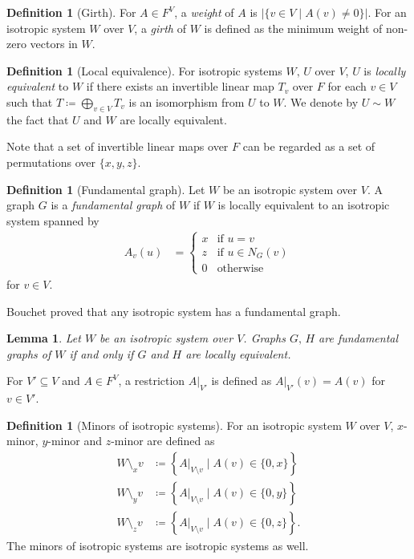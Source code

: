 \documentclass[twoside,10pt]{article}
\newtheorem{lemma}[theorem]{Lemma}
\theoremstyle{definition}
\newtheorem{definition}[theorem]{Definition}
\theoremstyle{remark}
\begin{document}
\begin{definition}[Girth]
For $A\in F^V$, a \textit{weight} of $A$ is $|\{v\in V\mid A(v)\ne 0\}|$.
For an isotropic system $W$ over $V$, a \textit{girth} of $W$ is defined as the minimum weight of non-zero vectors in $W$.
\end{definition}

\begin{definition}[Local equivalence]
For isotropic systems $W,\,U$ over $V$, $U$ is \textit{locally equivalent} to $W$ if there exists an invertible linear map $T_v$ over $F$ for each $v\in V$ such that $T\coloneqq \bigoplus_{v\in V}T_v$ is an isomorphism from $U$ to $W$.
We denote by $U\sim W$ the fact that $U$ and $W$ are locally equivalent.
\end{definition}
Note that a set of invertible linear maps over $F$ can be regarded as a set of permutations over $\{x,y,z\}$.

\begin{definition}[Fundamental graph]
Let $W$ be an isotropic system over $V$.
A graph $G$ is a \textit{fundamental graph} of $W$ if $W$ is locally equivalent to an isotropic system spanned by
\begin{align*}
A_v(u) &=
\begin{cases}
 x& \text{if } u = v\\
 z& \text{if } u\in N_G(v)\\
 0& \text{otherwise}
\end{cases}
\end{align*}
for $v\in V$.
\end{definition}

Bouchet proved that any isotropic system has a fundamental graph.

\begin{lemma}
Let $W$ be an isotropic system over $V$.
Graphs $G,\,H$ are fundamental graphs of $W$ if and only if $G$ and $H$ are locally equivalent.
\end{lemma}

For $V'\subseteq V$ and $A\in F^V$, a restriction $A|_{V'}$ is defined as $A|_{V'}(v)=A(v)$ for $v\in V'$.
\begin{definition}[Minors of isotropic systems]
For an isotropic system $W$ over $V$, $x$-minor, $y$-minor and $z$-minor are defined as
\begin{align*}
W\setminus_x v&\coloneqq\left\{A|_{V\setminus v}\mid A(v)\in\{0,x\}\right\}\\
W\setminus_y v&\coloneqq\left\{A|_{V\setminus v}\mid A(v)\in\{0,y\}\right\}\\
W\setminus_z v&\coloneqq\left\{A|_{V\setminus v}\mid A(v)\in\{0,z\}\right\}.
\end{align*}
The minors of isotropic systems are isotropic systems as well.
\end{definition}
\end{document}
